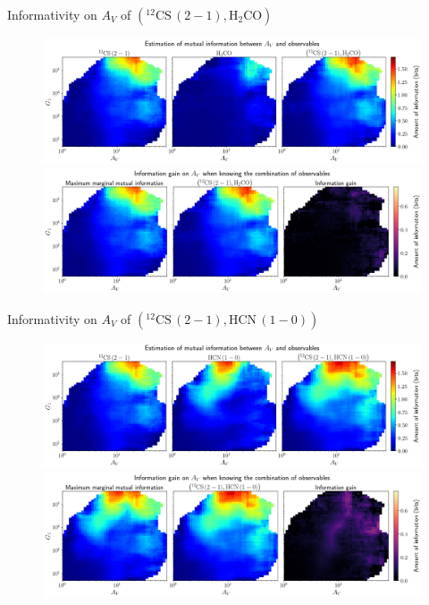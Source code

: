 \documentclass{beamer}
\begin{document}
\begin{frame}{Informativity on $A_V$ of $\left(\mathrm{^{12}CS\,(2-1)},\mathrm{H_2CO}\right)$}
    \begin{figure}
        \centering
        \includegraphics[width=0.95\linewidth]{../mi/av__12cs21_h2co_mi.png}
        \vfill
        \includegraphics[width=0.95\linewidth]{../mi/av__12cs21_h2co_mi_gain.png}
    \end{figure}
\end{frame}

\begin{frame}{Informativity on $A_V$ of $\left(\mathrm{^{12}CS\,(2-1)},\mathrm{HCN\,(1-0)}\right)$}
    \begin{figure}
        \centering
        \includegraphics[width=0.95\linewidth]{../mi/av__12cs21_hcn10_mi.png}
        \vfill
        \includegraphics[width=0.95\linewidth]{../mi/av__12cs21_hcn10_mi_gain.png}
    \end{figure}
\end{frame}
\end{document}
